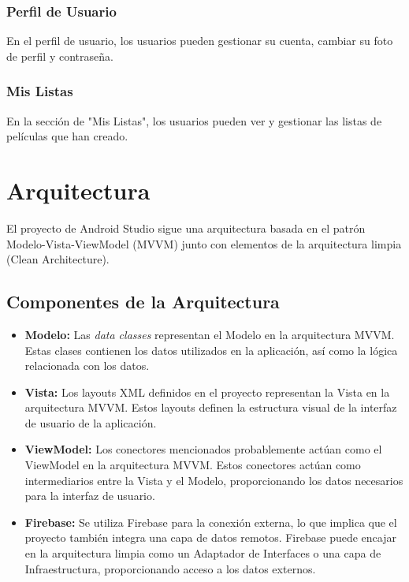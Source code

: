 \documentclass{article}
\begin{document}
    \subsubsection{Perfil de Usuario}
    En el perfil de usuario, los usuarios pueden gestionar su cuenta, cambiar su foto de perfil y contraseña.

    \subsubsection{Mis Listas}
    En la sección de "Mis Listas", los usuarios pueden ver y gestionar las listas de películas que han creado.

\section{Arquitectura}

    El proyecto de Android Studio sigue una arquitectura basada en el patrón Modelo-Vista-ViewModel (MVVM) junto con elementos de la arquitectura limpia (Clean Architecture).

    \subsection{Componentes de la Arquitectura}

    \begin{itemize}
        \item \textbf{Modelo:} Las \emph{data classes} representan el Modelo en la arquitectura MVVM. Estas clases contienen los datos utilizados en la aplicación, así como la lógica relacionada con los datos.

        \item \textbf{Vista:} Los layouts XML definidos en el proyecto representan la Vista en la arquitectura MVVM. Estos layouts definen la estructura visual de la interfaz de usuario de la aplicación.

        \item \textbf{ViewModel:} Los conectores mencionados probablemente actúan como el ViewModel en la arquitectura MVVM. Estos conectores actúan como intermediarios entre la Vista y el Modelo, proporcionando los datos necesarios para la interfaz de usuario.

        \item \textbf{Firebase:} Se utiliza Firebase para la conexión externa, lo que implica que el proyecto también integra una capa de datos remotos. Firebase puede encajar en la arquitectura limpia como un Adaptador de Interfaces o una capa de Infraestructura, proporcionando acceso a los datos externos.
    \end{itemize}
\end{document}
